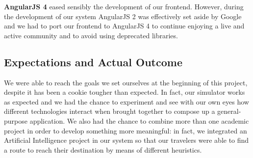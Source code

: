 \noindent\textbf{AngularJS 4} eased sensibly the development of our frontend.
However, during the development of our system AngularJS 2 was effectively set
aside by Google and we had to port our frontend to AngularJS 4 to continue
enjoying a live and active community and to avoid using deprecated libraries.

\subsection{Expectations and Actual Outcome}

We were able to reach the goals we set ourselves at the beginning of this
project, despite it has been a cookie tougher than expected.
In fact, our simulator works as expected and we had the chance to experiment
and see with our own eyes how different technologies interact when brought
together to compose up a general-purpose application.
We also had the chance to combine more than one academic project in order to
develop something more meaningful: in fact, we integrated an Artificial
Intelligence project in our system so that our travelers were able to find a
route to reach their destination by means of different heuristics.
